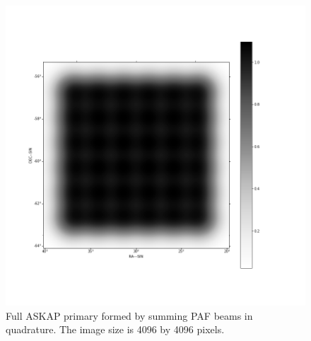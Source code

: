 \documentclass[11pt,a4paper,variablewidth]{article}
\begin{document}
\begin{figure}[H]
  \centering
  \includegraphics[width=\textwidth]{./pngs/full_askap_pb_4096.png}
  \caption{Full ASKAP primary formed by summing PAF beams in quadrature. The image size is 4096 by 4096 pixels.}
  \label{fig:full_askap_pb}
\end{figure}
\end{document}
